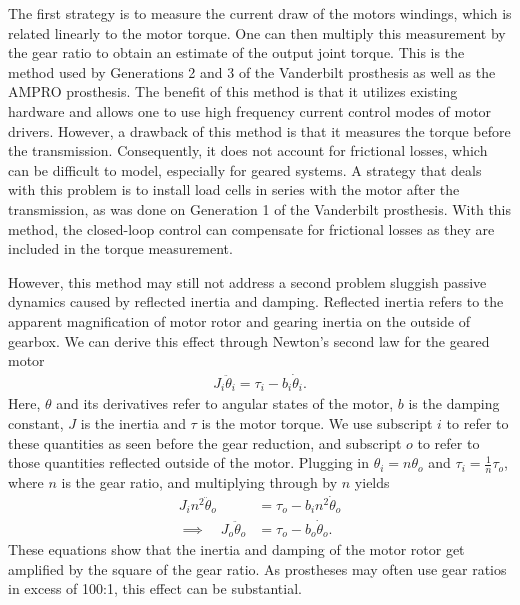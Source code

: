 The first strategy is to measure the current draw of the motors windings, which
is related linearly to the motor torque. One can then multiply this measurement
by the gear ratio to obtain an estimate of the output joint torque. This is the
method used by Generations 2 and 3 of the Vanderbilt prosthesis as well as the
AMPRO prosthesis. The benefit of this method is that it utilizes existing
hardware and allows one to use high frequency current control modes of motor
drivers. However, a drawback of this method is that it measures the torque
before the transmission. Consequently, it does not account for frictional
losses, which can be difficult to model, especially for geared systems. A
strategy that deals with this problem is to install load cells in series with
the motor after the transmission, as was done on Generation 1 of the Vanderbilt
prosthesis. With this method, the closed-loop control can compensate for
frictional losses as they are included in the torque measurement. 

However, this method may still not address a second problem sluggish passive
dynamics caused by reflected inertia and damping. Reflected inertia refers to
the apparent magnification of motor rotor and gearing inertia on the outside of
gearbox.  We can derive this effect through Newton's second law for the geared
motor
\begin{align}
    J_i \ddot{\theta}_i = \tau_i - b_i \dot{\theta}_i.
\end{align}
Here, $\theta$ and its derivatives refer to angular states of the motor, $b$
is the damping constant, $J$ is the inertia and $\tau$ is the motor torque. We
use subscript $i$ to refer to these quantities as seen before the gear
reduction, and subscript $o$ to refer to those quantities reflected outside of
the motor. Plugging in $\theta_i = n \theta_o$ and $\tau_i = \frac{1}{n}
\tau_o$, where $n$ is the gear ratio, and multiplying through by $n$ yields
\begin{align}
    J_i n^2 \ddot{\theta}_o &= \tau_o - b_i n^2 \dot{\theta}_o \\
    \implies \quad J_o \ddot{\theta}_o &= \tau_o - b_o \dot{\theta}_o.
\end{align}
These equations show that the inertia and damping of the motor rotor get
amplified by the square of the gear ratio. As prostheses may often use gear
ratios in excess of 100:1, this effect can be substantial. 

